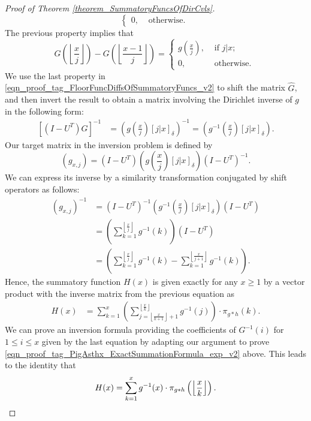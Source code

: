 \documentclass[11pt,reqno,a4letter]{article}
\numberwithin{figure}{section}
\numberwithin{table}{section}
\newcommand{\Iverson}[1]{\ensuremath{\left[#1\right]_{\delta}}}
\newcommand{\floor}[1]{\left\lfloor #1 \right\rfloor}
\newcommand{\Floor}[2]{\ensuremath{\left\lfloor \frac{#1}{#2} \right\rfloor}}
\theoremstyle{plain}
\numberwithin{theorem}{section}
\theoremstyle{definition}
\begin{document}
\begin{proof}[Proof of Theorem \ref{theorem_SummatoryFuncsOfDirCvls}]
\[\begin{cases}
     0, & \text{ otherwise. } 
     \end{cases} 
\] 
The previous property implies that 
\begin{equation} 
\label{eqn_proof_tag_FloorFuncDiffsOfSummatoryFuncs_v2} 
G\left(\floor{\frac{x}{j}}\right) - G\left(\floor{\frac{x-1}{j}}\right) = 
     \begin{cases} 
     g\left(\frac{x}{j}\right), & \text{ if $j | x$; } \\ 
     0, & \text{ otherwise. } 
     \end{cases}
\end{equation} 
We use the last property in \eqref{eqn_proof_tag_FloorFuncDiffsOfSummatoryFuncs_v2} 
to shift the matrix $\hat{G}$, and then invert the result to obtain a matrix involving the 
Dirichlet inverse of $g$ in the following form: 
\begin{align*} 
\left[(I-U^{T}) \hat{G}\right]^{-1} & = \left(g\left(\frac{x}{j}\right) \Iverson{j|x}\right)^{-1} = 
     \left(g^{-1}\left(\frac{x}{j}\right) \Iverson{j|x}\right). 
\end{align*} 
Our target matrix in the inversion problem is defined by 
$$(g_{x,j}) = (I-U^{T}) \left(g\left(\frac{x}{j}\right) \Iverson{j|x}\right) (I-U^{T})^{-1}.$$
We can express its inverse by a similarity transformation conjugated by shift operators as follows: 
\begin{align*} 
(g_{x,j})^{-1} & = (I-U^{T})^{-1} \left(g^{-1}\left(\frac{x}{j}\right) \Iverson{j|x}\right) (I-U^{T}) \\ 
     & = \left(\sum_{k=1}^{\floor{\frac{x}{j}}} g^{-1}(k)\right) (I-U^{T}) \\ 
     & = \left(\sum_{k=1}^{\floor{\frac{x}{j}}} g^{-1}(k) - \sum_{k=1}^{\floor{\frac{x}{j+1}}} g^{-1}(k)\right). 
\end{align*} 
Hence, the summatory function $H(x)$ is given exactly for any $x \geq 1$ 
by a vector product with the inverse matrix from the previous equation as 
\begin{align*} 
H(x) & = \sum_{k=1}^x \left(\sum_{j=\floor{\frac{x}{k+1}}+1}^{\floor{\frac{x}{k}}} g^{-1}(j)\right) 
     \cdot \pi_{g \ast h}(k). 
\end{align*} 
We can prove an inversion formula providing the coefficients of $G^{-1}(i)$ for $1 \leq i \leq x$ given 
by the last equation by adapting our argument to prove 
\eqref{eqn_proof_tag_PigAsthx_ExactSummationFormula_exp_v2} above. 
This leads to the identity that 
\[
H(x) = \sum_{k=1}^{x} g^{-1}(x) \cdot \pi_{g \ast h}\left(\Floor{x}{k}\right). 
     \qedhere 
\]
\end{proof} 
\end{document}

